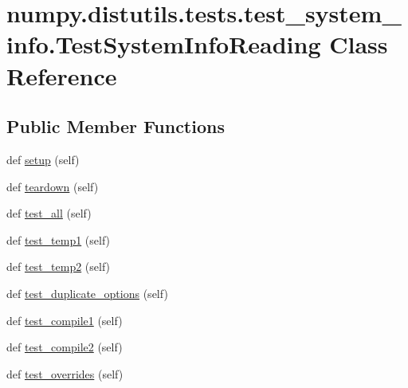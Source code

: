 \hypertarget{classnumpy_1_1distutils_1_1tests_1_1test__system__info_1_1TestSystemInfoReading}{}\section{numpy.\+distutils.\+tests.\+test\+\_\+system\+\_\+info.\+Test\+System\+Info\+Reading Class Reference}
\label{classnumpy_1_1distutils_1_1tests_1_1test__system__info_1_1TestSystemInfoReading}
\subsection*{Public Member Functions}
\begin{DoxyCompactItemize}
\item 
def \hyperlink{classnumpy_1_1distutils_1_1tests_1_1test__system__info_1_1TestSystemInfoReading_a463675e83d778ff5c539982ff0ad499a}{setup} (self)
\item 
def \hyperlink{classnumpy_1_1distutils_1_1tests_1_1test__system__info_1_1TestSystemInfoReading_ab9d59ba02bce2e4df63dee9a1a736388}{teardown} (self)
\item 
def \hyperlink{classnumpy_1_1distutils_1_1tests_1_1test__system__info_1_1TestSystemInfoReading_a4ffefc31d49643ae495ecfe1db1177b0}{test\+\_\+all} (self)
\item 
def \hyperlink{classnumpy_1_1distutils_1_1tests_1_1test__system__info_1_1TestSystemInfoReading_a0a9e2ff4ddf550f56e943c4d48f5214d}{test\+\_\+temp1} (self)
\item 
def \hyperlink{classnumpy_1_1distutils_1_1tests_1_1test__system__info_1_1TestSystemInfoReading_a0be0aa6df62de2eb06c404a95e013aca}{test\+\_\+temp2} (self)
\item 
def \hyperlink{classnumpy_1_1distutils_1_1tests_1_1test__system__info_1_1TestSystemInfoReading_acff40c9ed9c9da8424f5f80e86a672a2}{test\+\_\+duplicate\+\_\+options} (self)
\item 
def \hyperlink{classnumpy_1_1distutils_1_1tests_1_1test__system__info_1_1TestSystemInfoReading_a4a3deee9061dc2840b44d0c749cc3b8c}{test\+\_\+compile1} (self)
\item 
def \hyperlink{classnumpy_1_1distutils_1_1tests_1_1test__system__info_1_1TestSystemInfoReading_acc720446726e8339f56b7e41c5398b49}{test\+\_\+compile2} (self)
\item 
def \hyperlink{classnumpy_1_1distutils_1_1tests_1_1test__system__info_1_1TestSystemInfoReading_a5272bd223041392dabedc16a155a9d49}{test\+\_\+overrides} (self)
\end{DoxyCompactItemize}
